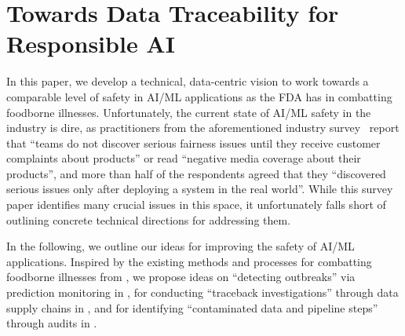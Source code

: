 \section{Towards Data Traceability for Responsible AI}
\label{sec:vision}


In this paper, we develop a technical, data-centric vision to work towards a comparable level of safety in AI/ML applications as the FDA has in combatting foodborne illnesses. Unfortunately, the current state of AI/ML safety in the industry is dire, as practitioners from the aforementioned industry survey~\cite{holstein2019improving} report that ``teams do not discover serious fairness issues until they receive customer complaints about products'' or read ``negative media coverage about their products'', and more than half of the respondents agreed that they ``discovered serious issues only after deploying a system in the real world''. While this survey paper identifies many crucial issues in this space, it unfortunately falls short of outlining concrete technical directions for addressing them. 

In the following, we outline our ideas for improving the safety of AI/ML applications. Inspired by the existing methods and processes for combatting foodborne illnesses from , we propose ideas on ``detecting outbreaks'' via prediction monitoring in , for conducting ``traceback investigations'' through data supply chains in , and for identifying ``contaminated data and pipeline steps'' through audits in .